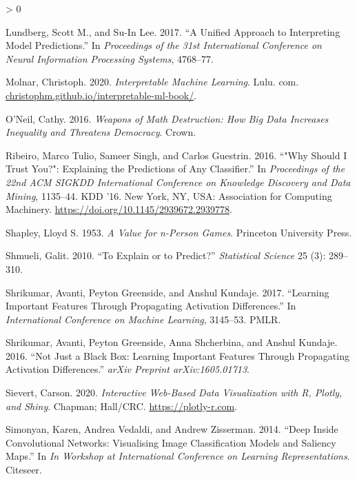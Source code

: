 \documentclass[
]{article}
\newlength{\cslhangindent}
\newenvironment{CSLReferences}[2] %
 {%
  \setlength{\parindent}{0pt}
  \ifodd #1 \everypar{\setlength{\hangindent}{\cslhangindent}}\ignorespaces\fi
  \ifnum #2 > 0
  \setlength{\parskip}{#2\baselineskip}
  \fi
 }%
 {}
\begin{document}
\begin{CSLReferences}{1}{0}
\leavevmode\hypertarget{ref-lundberg_unified_2017}{}%
Lundberg, Scott M., and Su-In Lee. 2017. {``A Unified Approach to Interpreting Model Predictions.''} In \emph{Proceedings of the 31st International Conference on Neural Information Processing Systems}, 4768--77.

\leavevmode\hypertarget{ref-molnar_interpretable_2020}{}%
Molnar, Christoph. 2020. \emph{Interpretable Machine Learning}. Lulu. com. \href{https://christophm.github.io/interpretable-ml-book/}{christophm.github.io/interpretable-ml-book/}.

\leavevmode\hypertarget{ref-oneil_weapons_2016}{}%
O'Neil, Cathy. 2016. \emph{Weapons of Math Destruction: {How} Big Data Increases Inequality and Threatens Democracy}. Crown.

\leavevmode\hypertarget{ref-ribeiro_why_2016}{}%
Ribeiro, Marco Tulio, Sameer Singh, and Carlos Guestrin. 2016. {``"{Why} {Should} {I} {Trust} {You}?": {Explaining} the {Predictions} of {Any} {Classifier}.''} In \emph{Proceedings of the 22nd {ACM} {SIGKDD} {International} {Conference} on {Knowledge} {Discovery} and {Data} {Mining}}, 1135--44. {KDD} '16. New York, NY, USA: Association for Computing Machinery. \url{https://doi.org/10.1145/2939672.2939778}.

\leavevmode\hypertarget{ref-shapley_value_1953}{}%
Shapley, Lloyd S. 1953. \emph{A Value for n-Person Games}. Princeton University Press.

\leavevmode\hypertarget{ref-shmueli_explain_2010}{}%
Shmueli, Galit. 2010. {``To Explain or to Predict?''} \emph{Statistical Science} 25 (3): 289--310.

\leavevmode\hypertarget{ref-shrikumar_learning_2017}{}%
Shrikumar, Avanti, Peyton Greenside, and Anshul Kundaje. 2017. {``Learning Important Features Through Propagating Activation Differences.''} In \emph{International {Conference} on {Machine} {Learning}}, 3145--53. PMLR.

\leavevmode\hypertarget{ref-shrikumar_not_2016}{}%
Shrikumar, Avanti, Peyton Greenside, Anna Shcherbina, and Anshul Kundaje. 2016. {``Not Just a Black Box: {Learning} Important Features Through Propagating Activation Differences.''} \emph{arXiv Preprint arXiv:1605.01713}.

\leavevmode\hypertarget{ref-sievert_interactive_2020}{}%
Sievert, Carson. 2020. \emph{Interactive {Web}-{Based} {Data} {Visualization} with {R}, Plotly, and Shiny}. Chapman; Hall/CRC. \url{https://plotly-r.com}.

\leavevmode\hypertarget{ref-simonyan_deep_2014}{}%
Simonyan, Karen, Andrea Vedaldi, and Andrew Zisserman. 2014. {``Deep Inside Convolutional Networks: {Visualising} Image Classification Models and Saliency Maps.''} In \emph{In {Workshop} at {International} {Conference} on {Learning} {Representations}}. Citeseer.


\end{CSLReferences}
\end{document}
